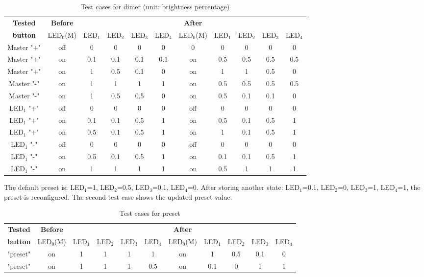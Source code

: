 {\begin{table}[H]
\begin{tabular}{c|c c c c c|c c c c c}
\textbf{Tested} &\textbf{Before} & && & & \textbf{After}&& &  &  \\
 \textbf{button} & LED$_0$(M) &LED$_1$& LED$_2$& LED$_3$& LED$_4$ & LED$_0$(M)& LED$_1$& LED$_2$& LED$_3$ &LED$_4$ \\\hline
Master "+" & off &0& 0& 0& 0 & 0& 0& 0& 0 &0 \\ 
Master "+" & on &0.1& 0.1& 0.1& 0.1 & on& 0.5& 0.5& 0.5 &0.5 \\ 
Master "+" & on &1& 0.5&0.1& 0 & on& 1& 1& 0.5&0 \\ 
Master "-" & on &1& 1& 1& 1 & on& 0.5& 0.5& 0.5 &0.5 \\
Master "-" & on &1& 0.5& 0.5& 0 & on& 0.5& 0.1& 0.1 &0 \\\hline
LED$_1$ "+" & off &0& 0& 0& 0 & off& 0& 0& 0 &0 \\
LED$_1$ "+" & on &0.1& 0.1& 0.5& 1 & on& 0.5& 0.1& 0.5 &1 \\
LED$_1$ "+" & on &0.5& 0.1& 0.5& 1 & on& 1& 0.1& 0.5 &1 \\
LED$_1$ "-" & off &0  & 0& 0& 0 & off& 0& 0& 0 &0 \\ 
LED$_1$ "-" & on &0.5& 0.1& 0.5& 1 & on& 0.1& 0.1& 0.5 &1 \\
LED$_1$ "-" & on &1& 1& 1& 1 & on& 0.5& 1& 1 &1 \\ \hline
\end{tabular}
\caption{\label{tab:Dimmer}Test cases for dimer (unit: brightness percentage)}
\end{table}

The default preset is: LED$_1$=1, LED$_2$=0.5, LED$_3$=0.1, LED$_4$=0. After storing another state: LED$_1$=0.1, LED$_2$=0, LED$_3$=1, LED$_4$=1, the preset is reconfigured. The second test case shows the updated preset value.
\begin{table}[H]
\begin{tabular}{c|c c c c c|c c c c c}
\textbf{Tested} &\textbf{Before} & && & & \textbf{After}&& &  &  \\
 \textbf{button} & LED$_0$(M) &LED$_1$& LED$_2$& LED$_3$& LED$_4$ & LED$_0$(M)& LED$_1$& LED$_2$& LED$_3$ &LED$_4$ \\\hline
"preset" & on &1& 1& 1& 1 & on& 1& 0.5& 0.1 &0 \\ \hline
"preset" & on &1& 1& 1& 0.5 & on& 0.1& 0& 1 &1 \\ \hline
\end{tabular}
\caption{\label{tab:Dimmer}Test cases for preset}
\end{table}

}
